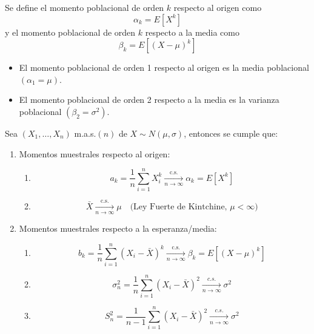 \begin{definición}
Se define el momento poblacional de orden $k$ respecto al origen como
\[\alpha_{k}=E\left[X^{k}\right]\]
y el momento poblacional de orden $k$ respecto a la media como
\[\beta_{k}=E\left[(X-\mu)^{k}\right]\]
\end{definición}

\begin{observación}
\vspace{-\topsep} %
\vspace{-\topsep} %
\vspace{-\topsep} %
\begin{itemize}
	\item El momento poblacional de orden 1 respecto al origen es la media poblacional
	      $(\alpha_1 = \mu)$.
	\item El momento poblacional de orden 2 respecto a la media es la varianza
	      poblacional $(\beta_2 = \sigma^2)$.
\end{itemize}
\end{observación}

\begin{proposición}
Sea $\left(X_{1}, \ldots, X_{n}\right)$ m.a.s.$(n)$ de $X \sim N(\mu, \sigma)$, entonces se cumple que:
\begin{enumerate}
	\item Momentos muestrales respecto al origen:
	      \begin{enumerate}
		      \item $$    a_{k}=\frac{1}{n} \sum_{i=1}^{n} X_{i}^{k} \xrightarrow[n \rightarrow \infty]{\text{c.s.}} \alpha_{k}=E\left[X^{k}\right]$$
		      \item $$     \bar{X} \xrightarrow[n \rightarrow \infty]{\text{c.s.}} \mu \quad \text{(Ley Fuerte de Kintchine, } \mu<\infty \text{)}$$
	      \end{enumerate}
	\item Momentos muestrales respecto a la esperanza/media:
	      \begin{enumerate}
		      \item  $$b_{k}=\frac{1}{n} \sum_{i=1}^{n}\left(X_{i}-\bar{X}\right)^{k} \xrightarrow[n \rightarrow \infty]{\text{c.s.}} \beta_{k}=E\left[(X-\mu)^{k}\right]$$
		      \item $$ \sigma_n^2 = \frac{1}{n}\sum_{i = 1}^{n}(X_i - \bar{X})^2 \underset{n \to \infty}{\xrightarrow{c.s.}} \sigma^2 $$
		      \item $$ S_n^2 = \frac{1}{n-1}\sum_{i = 1}^{n}(X_i - \bar{X})^2\underset{n \to \infty}{\xrightarrow{c.s.}} \sigma^2 $$
	      \end{enumerate}
\end{enumerate}
\end{proposición}


